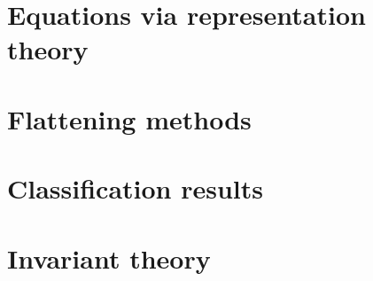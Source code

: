 \chapter{Equations via representation theory}
\label{RepTheory-chapter-equations}


\chapter{Flattening methods}
\label{RepTheory-chapter-flattenings}


\chapter{Classification results}
\label{RepTheory-chapter-classifications}


% 
\chapter{Invariant theory}
\label{RepTheory-chapter-invariantTheory}

